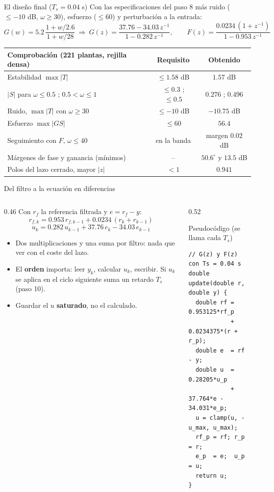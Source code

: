 \documentclass[aspectratio=169,11pt]{beamer}
\begin{document}
\begin{frame}{El diseño final ($T_s=0.04$ s)}
  \footnotesize
  Con las especificaciones del paso 8 más ruido ($\le-10$ dB, $\omega\ge30$), esfuerzo ($\le60$) y perturbación a la entrada:
  \[ G(w)=5.2\,\frac{1+w/2.6}{1+w/28}\ \Rightarrow\ G(z)=\frac{37.76-34.03\,z^{-1}}{1-0.282\,z^{-1}},\qquad F(z)=\frac{0.0234\,(1+z^{-1})}{1-0.953\,z^{-1}} \]
  \begin{center}
  \begin{tabular}{l|c|c}
    Comprobación (221 plantas, rejilla densa) & Requisito & Obtenido\\\hline
    Estabilidad $\max|T|$ & $\le1.58$ dB & $1.57$ dB\\
    $|S|$ para $\omega\le0.5$ ; $0.5<\omega\le1$ & $\le0.3$ ; $\le0.5$ & $0.276$ ; $0.496$\\
    Ruido, $\max|T|$ con $\omega\ge30$ & $\le-10$ dB & $-10.75$ dB\\
    Esfuerzo $\max|GS|$ & $\le60$ & $56.4$\\
    Seguimiento con $F$, $\omega\le40$ & en la banda & margen $0.02$ dB\\
    Márgenes de fase y ganancia (mínimos) & -- & $50.6^\circ$ y $13.5$ dB\\
    Polos del lazo cerrado, mayor $|z|$ & $<1$ & $0.941$
  \end{tabular}
  \end{center}
\end{frame}

\begin{frame}[fragile]{Del filtro a la ecuación en diferencias}
  \footnotesize
  \begin{columns}[T]
  \begin{column}{0.46\textwidth}
    Con $r_f$ la referencia filtrada y $e=r_f-y$:
    \[ r_{f,k}=0.953\,r_{f,k-1}+0.0234\,(r_k+r_{k-1}) \]
    \[ u_k=0.282\,u_{k-1}+37.76\,e_k-34.03\,e_{k-1} \]
    \begin{itemize}
      \item Dos multiplicaciones y una suma por filtro: nada que ver con el coste del lazo.
      \item El \textbf{orden} importa: leer $y_k$, calcular $u_k$, escribir. Si $u_k$ se aplica en el ciclo siguiente suma un retardo $T_s$ (paso 10).
      \item Guardar el $u$ \textbf{saturado}, no el calculado.
    \end{itemize}
  \end{column}
  \begin{column}{0.52\textwidth}
    \begin{block}{Pseudocódigo (se llama cada $T_s$)}
\begin{verbatim}
// G(z) y F(z) con Ts = 0.04 s
double update(double r, double y) {
  double rf = 0.953125*rf_p
            + 0.0234375*(r + r_p);
  double e  = rf - y;
  double u  = 0.28205*u_p
            + 37.764*e - 34.031*e_p;
  u = clamp(u, -u_max, u_max);
  rf_p = rf; r_p = r;
  e_p  = e;  u_p = u;
  return u;
}
\end{verbatim}
    \end{block}
  \end{column}
  \end{columns}
\end{frame}
\end{document}
